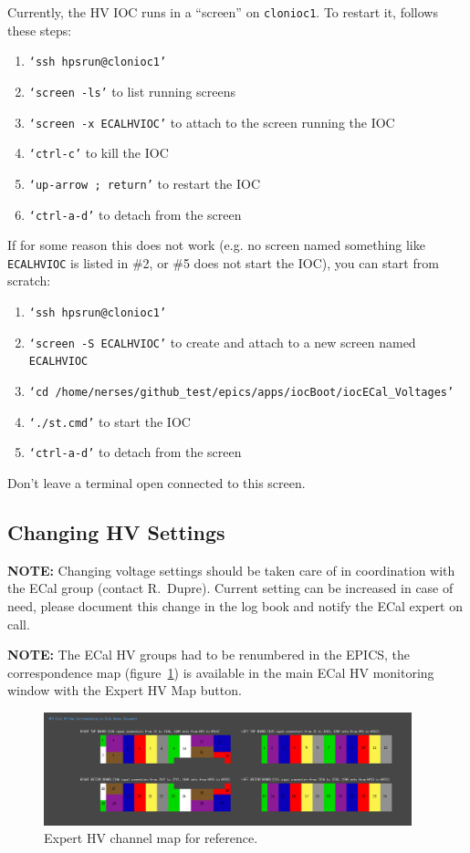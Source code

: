 \documentclass[12pt]{article}
\begin{document}
{   Currently, the HV IOC runs in a ``screen'' on \texttt{clonioc1}.  To restart it, follows these steps:
   {\footnotesize
   \begin{enumerate}
       \item \texttt{`ssh hpsrun@clonioc1'}
       \item \texttt{`screen -ls'} to list running screens
       \item \texttt{`screen -x ECALHVIOC'} to attach to the screen running the IOC
       \item \texttt{`ctrl-c'} to kill the IOC
       \item \texttt{`up-arrow ; return'} to restart the IOC
       \item \texttt{`ctrl-a-d'} to detach from the screen
   \end{enumerate}
   }
   If for some reason this does not work (e.g. no screen named something like \texttt{ECALHVIOC} is listed in \#2, or \#5 does not start the IOC), you can start from scratch:
   {\footnotesize
   \begin{enumerate}
       \item \texttt{`ssh hpsrun@clonioc1'}
       \item \texttt{`screen -S ECALHVIOC'} to create and attach to a new screen named \texttt{ECALHVIOC}
       \item \texttt{`cd /home/nerses/github\_test/epics/apps/iocBoot/iocECal\_Voltages'}
       \item \texttt{`./st.cmd'} to start the IOC
       \item \texttt{`ctrl-a-d'} to detach from the screen
   \end{enumerate}
   }
   Don't leave a terminal open connected to this screen.
   \subsection{Changing HV Settings}
      {\bf NOTE:} Changing voltage settings should be taken care of in coordination with the ECal group (contact R.~Dupre). Current setting can be increased in case of need, please document this change in the log book and notify the ECal expert on call.

 {\bf NOTE:} The ECal HV groups had to be renumbered in the EPICS, the correspondence map (figure~\ref{ExpertMap}) is available in the main ECal HV monitoring window with the Expert HV Map button.

\begin{figure}[htbp]
\center
\includegraphics[width=0.95\textwidth]{pics/ecalhv_expertmap_2014_12_15.png}
\caption{\small \label{ExpertMap} Expert HV channel map for reference.}
\end{figure}

}
\end{document}
